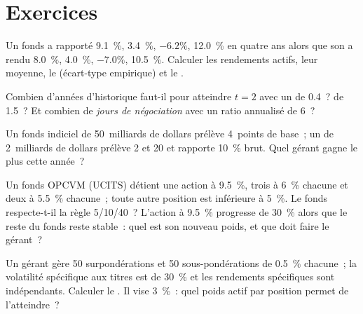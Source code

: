 \section{Exercices}

\begin{exercise}[$\star$]\label{exo:m1:the-buy-side:1}
Un fonds a rapporté 9.1~\%, 3.4~\%, $-6.2\%$, 12.0~\% en quatre ans alors que son
 a rendu 8.0~\%, 4.0~\%, $-7.0\%$, 10.5~\%. Calculer les
rendements actifs, leur moyenne, le  (écart-type empirique) et le
.
\end{exercise}

\begin{exercise}[$\star$]\label{exo:m1:the-buy-side:2}
Combien d'années d'historique faut-il pour atteindre $t = 2$ avec un
 de 0.4~? de 1.5~? Et combien de \emph{jours de négociation} avec un ratio annualisé
de 6~?
\end{exercise}

\begin{exercise}[$\star$]\label{exo:m1:the-buy-side:3}
Un fonds indiciel de 50~milliards de dollars prélève 4~points de base~; un  de 2~milliards de dollars
prélève 2 et 20 et rapporte 10~\% brut. Quel gérant gagne le plus cette année~?
\end{exercise}

\begin{exercise}[$\star\star$]\label{exo:m1:the-buy-side:4}
Un fonds OPCVM (UCITS) détient une action à 9.5~\%, trois à 6~\% chacune et deux à 5.5~\%
chacune~; toute autre position est inférieure à 5~\%. Le fonds respecte-t-il la règle 5/10/40~?
L'action à 9.5~\% progresse de 30~\% alors que le reste du fonds reste stable~: quel est son
nouveau poids, et que doit faire le gérant~?
\end{exercise}

\begin{exercise}[$\star\star$]\label{exo:m1:the-buy-side:5}
Un gérant gère 50 surpondérations et 50 sous-pondérations de 0.5~\% chacune~;
la volatilité spécifique aux titres est de 30~\% et les rendements spécifiques sont indépendants.
Calculer le . Il vise 3~\%~: quel poids actif par position
permet de l'atteindre~?
\end{exercise}

